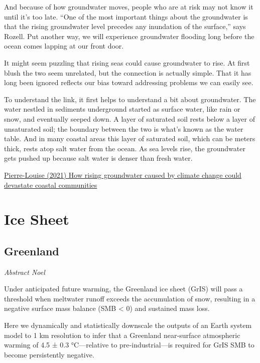 \documentclass[
]{book}
\begin{document}
And because of how groundwater moves, people who are at risk may not know it until it's too late. ``One of the most important things about the groundwater is that the rising groundwater level precedes any inundation of the surface,'' says Rozell. Put another way, we will experience groundwater flooding long before the ocean comes lapping at our front door.

It might seem puzzling that rising seas could cause groundwater to rise. At first blush the two seem unrelated, but the connection is actually simple. That it has long been ignored reflects our bias toward addressing problems we can easily see.

To understand the link, it first helps to understand a bit about groundwater. The water nestled in sediments underground started as surface water, like rain or snow, and eventually seeped down. A layer of saturated soil rests below a layer of unsaturated soil; the boundary between the two is what's known as the water table. And in many coastal areas this layer of saturated soil, which can be meters thick, rests atop salt water from the ocean. As sea levels rise, the groundwater gets pushed up because salt water is denser than fresh water.

\href{https://www.technologyreview.com/2021/12/13/1041309/climate-change-rising-groundwater-flooding/}{Pierre-Louise (2021) How rising groundwater caused by climate change could devastate coastal communities}

\hypertarget{ice-sheet}{%
\chapter{Ice Sheet}\label{ice-sheet}}

\hypertarget{greenland}{%
\section{Greenland}\label{greenland}}

\emph{Abstract Noel}

Under anticipated future warming, the Greenland ice sheet (GrIS) will
pass a threshold when meltwater runoff exceeds the accumulation of snow,
resulting in a negative surface mass balance (SMB \textless{} 0) and sustained mass loss.

Here we dynamically and statistically downscale the outputs of an
Earth system model to 1 km resolution to infer that a Greenland near‐surface
atmospheric warming of 4.5 ± 0.3 °C---relative to pre‐industrial---is required
for GrIS SMB to become persistently negative.
\end{document}
